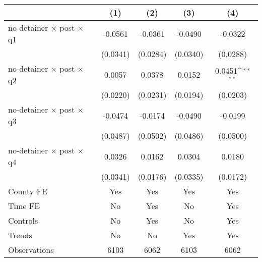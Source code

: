 {
\def\sym#1{\ifmmode^{#1}\else\(^{#1}\)\fi}
\begin{tabular*}{0.7\textwidth}{@{\hskip\tabcolsep\extracolsep\fill}l*{4}{c}}
\hline\hline
                    &\multicolumn{1}{c}{(1)}         &\multicolumn{1}{c}{(2)}         &\multicolumn{1}{c}{(3)}         &\multicolumn{1}{c}{(4)}         \\
\hline
no-detainer $\times$ post $\times$ q1&     -0.0561         &     -0.0361         &     -0.0490         &     -0.0322         \\
                    &    (0.0341)         &    (0.0284)         &    (0.0340)         &    (0.0288)         \\
[1em]
no-detainer $\times$ post $\times$ q2&      0.0057         &      0.0378         &      0.0152         &      0.0451\sym{**} \\
                    &    (0.0220)         &    (0.0231)         &    (0.0194)         &    (0.0203)         \\
[1em]
no-detainer $\times$ post $\times$ q3&     -0.0474         &     -0.0174         &     -0.0490         &     -0.0199         \\
                    &    (0.0487)         &    (0.0502)         &    (0.0486)         &    (0.0500)         \\
[1em]
no-detainer $\times$ post $\times$ q4&      0.0326         &      0.0162         &      0.0304         &      0.0180         \\
                    &    (0.0341)         &    (0.0176)         &    (0.0335)         &    (0.0172)         \\
[1em]
County FE           &         Yes         &         Yes         &         Yes         &         Yes         \\
[1em]
Time FE             &          No         &         Yes         &          No         &         Yes         \\
[1em]
Controls            &          No         &         Yes         &          No         &         Yes         \\
[1em]
Trends              &          No         &          No         &         Yes         &         Yes         \\
\hline
Observations        &        6103         &        6062         &        6103         &        6062         \\
\hline\hline
\end{tabular*}
}
